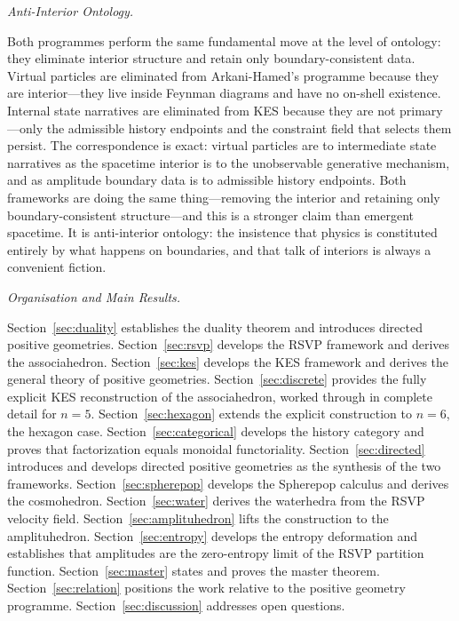 \documentclass[12pt, oneside]{amsart}
\theoremstyle{plain}
\theoremstyle{definition}
\theoremstyle{remark}
\begin{document}
\medskip\noindent\textit{Anti-Interior Ontology.}

Both programmes perform the same fundamental move at the level of ontology: they eliminate interior structure and retain only boundary-consistent data. Virtual particles are eliminated from Arkani-Hamed's programme because they are interior---they live inside Feynman diagrams and have no on-shell existence. Internal state narratives are eliminated from KES because they are not primary---only the admissible history endpoints and the constraint field that selects them persist. The correspondence is exact: virtual particles are to intermediate state narratives as the spacetime interior is to the unobservable generative mechanism, and as amplitude boundary data is to admissible history endpoints. Both frameworks are doing the same thing---removing the interior and retaining only boundary-consistent structure---and this is a stronger claim than emergent spacetime. It is anti-interior ontology: the insistence that physics is constituted entirely by what happens on boundaries, and that talk of interiors is always a convenient fiction.

\medskip\noindent\textit{Organisation and Main Results.}

Section~\ref{sec:duality} establishes the duality theorem and introduces directed positive geometries. Section~\ref{sec:rsvp} develops the RSVP framework and derives the associahedron. Section~\ref{sec:kes} develops the KES framework and derives the general theory of positive geometries. Section~\ref{sec:discrete} provides the fully explicit KES reconstruction of the associahedron, worked through in complete detail for $n=5$. Section~\ref{sec:hexagon} extends the explicit construction to $n=6$, the hexagon case. Section~\ref{sec:categorical} develops the history category and proves that factorization equals monoidal functoriality. Section~\ref{sec:directed} introduces and develops directed positive geometries as the synthesis of the two frameworks. Section~\ref{sec:spherepop} develops the Spherepop calculus and derives the cosmohedron. Section~\ref{sec:water} derives the waterhedra from the RSVP velocity field. Section~\ref{sec:amplituhedron} lifts the construction to the amplituhedron. Section~\ref{sec:entropy} develops the entropy deformation and establishes that amplitudes are the zero-entropy limit of the RSVP partition function. Section~\ref{sec:master} states and proves the master theorem. Section~\ref{sec:relation} positions the work relative to the positive geometry programme. Section~\ref{sec:discussion} addresses open questions.
\end{document}
